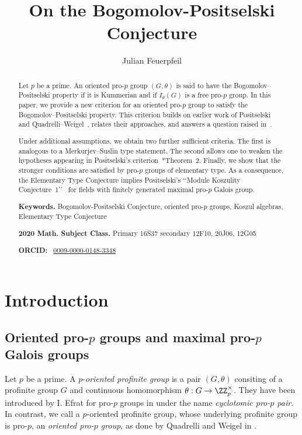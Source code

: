 \documentclass{amsart}
\title{On the  Bogomolov-Positselski Conjecture
}
\author{Julian Feuerpfeil}
\theoremstyle{definition}
\theoremstyle{remark}
\numberwithin{equation}{section}
\begin{document}
\begin{abstract} 
Let $p$ be a prime. An oriented pro-$p$ group $(G,\theta)$ is said to have the Bogomolov--Positselski property if it is Kummerian and if $I_\theta(G)$ is a free pro-$p$ group. In this paper, we provide a new criterion for an oriented pro-$p$ group to satisfy the Bogomolov--Positselski property. This criterion builds on earlier work of Positselski~\cite{Positselski2005} and Quadrelli--Weigel~\cite{QuadrelliWeigel2022}, relates their approaches, and answers a question raised in~\cite{QuadrelliWeigel2022}.

Under additional assumptions, we obtain two further sufficient criteria. The first is analogous to a Merkurjev--Suslin type statement. The second allows one to weaken the hypotheses appearing in Positselski's criterion~\cite{Positselski2005}*{Theorem~2}. Finally, we show that the stronger conditions are satisfied by pro-$p$ groups of elementary type. As a consequence, the Elementary Type Conjecture implies Positselski's \lq\lq Module Koszulity Conjecture~1\rq\rq~\cite{Positselski2014} for fields with finitely generated maximal pro-$p$ Galois group.

\noindent \textbf{Keywords. } Bogomolov-Positselski Conjecture, oriented pro-$p$ groups, Koszul algebras, Elementary Type Conjecture

\noindent \textbf{2020 Math. Subject Class.} Primary 16S37 secondary 12F10, 20J06, 12G05



\noindent \textbf{ORCID:} \ \href{https://orcid.org/0009-0000-0148-3348}{0009-0000-0148-3348}


\end{abstract}


\maketitle

\section{Introduction}
\subsection{Oriented pro-\texorpdfstring{$p$}{} groups and maximal pro-\texorpdfstring{$p$}{} Galois groups}
Let $p$ be a prime. A $p$-\emph{oriented profinite group} is a pair $(G,\theta)$ consiting of a profinite group $G$ and continuous homomorphism $\theta:G\to \ZZ_p^\times$. They have been introduced by I. Efrat for pro-$p$ groups in \cite{Efrat1998} under the name \emph{cyclotomic pro-$p$ pair}. In contrast, we call a $p$-oriented profinite group, whose underlying profinite group is pro-$p$, an \emph{oriented pro-$p$ group}, as done by Quadrelli and Weigel in \cite{QuadrelliWeigel2022}.
\end{document}
